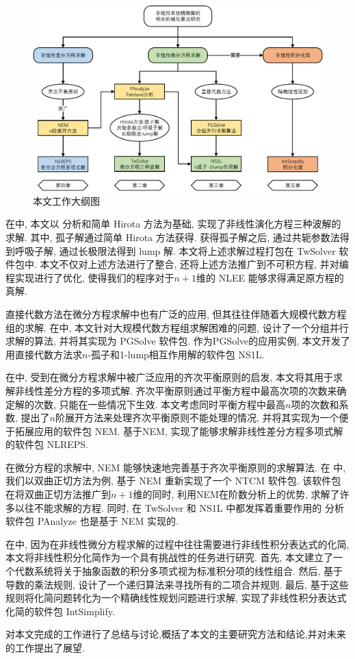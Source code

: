 \begin{figure}[htbp]
\includegraphics[width=\textwidth]{fig/outline.pdf}
\caption{本文工作大纲图}\label{outline}
\end{figure}

在中, 本文以 \Painleve{} 分析和简单 Hirota 方法为基础, 实现了非线性演化方程三种波解的求解. 其中, 孤子解通过简单 Hirota 方法获得. 获得孤子解之后, 通过共轭参数法得到呼吸子解, 通过长极限法得到 lump 解. 本文将上述求解过程打包在 TwSolver 软件包中. 本文不仅对上述方法进行了整合, 还将上述方法推广到不可积方程, 并对编程实现进行了优化, 使得我们的程序对于$n+1$维的 NLEE 能够求得满足原方程的真解. 

直接代数方法在微分方程求解中也有广泛的应用, 但其往往伴随着大规模代数方程组的求解. 在中, 本文针对大规模代数方程组求解困难的问题, 设计了一个分组并行求解的算法, 并将其实现为 PGSolve 软件包. 作为PGSolve的应用实例, 本文开发了用直接代数方法求$n$-孤子和1-lump相互作用解的软件包 NS1L. 

在中, 受到在微分方程求解中被广泛应用的齐次平衡原则的启发, 本文将其用于求解非线性差分方程的多项式解. 齐次平衡原则通过平衡方程中最高次项的次数来确定解的次数, 只能在一些情况下生效. 本文考虑同时平衡方程中最高$n$项的次数和系数, 提出了$n$阶展开方法来处理齐次平衡原则不能处理的情况, 并将其实现为一个便于拓展应用的软件包 NEM. 基于NEM, 实现了能够求解非线性差分方程多项式解的软件包 NLREPS. 

在微分方程的求解中, NEM 能够快速地完善基于齐次平衡原则的求解算法. 在  中, 我们以双曲正切方法为例, 基于 NEM 重新实现了一个 NTCM 软件包. 该软件包在将双曲正切方法推广到$n+1$维的同时, 利用NEM在阶数分析上的优势, 求解了许多以往不能求解的方程. 同时, 在 TwSolver 和 NS1L 中都发挥着重要作用的 \Painleve{}分析软件包 PAnalyze 也是基于 NEM 实现的.  

在中, 因为在非线性微分方程求解的过程中往往需要进行非线性积分表达式的化简, 本文将非线性积分化简作为一个具有挑战性的任务进行研究. 首先, 本文建立了一个代数系统将关于抽象函数的积分多项式视为标准积分项的线性组合. 然后, 基于导数的乘法规则, 设计了一个递归算法来寻找所有的二项合并规则. 最后, 基于这些规则将化简问题转化为一个精确线性规划问题进行求解, 实现了非线性积分表达式化简的软件包 IntSimplify. 

对本文完成的工作进行了总结与讨论,概括了本文的主要研究方法和结论,并对未来的工作提出了展望.
